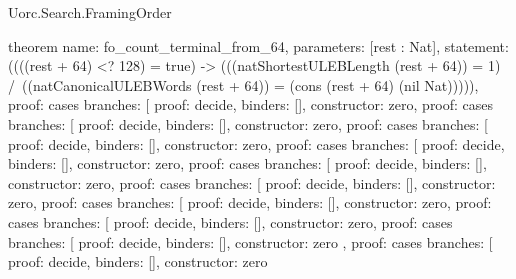 \begin{lexlean}{Uorc.Search.FramingOrder}
\begin{semanticmodule}
theorem{
  name: fo_count_terminal_from_64,
  parameters: [rest : Nat],
  statement: ((((rest + 64) <? 128) = true) -> (((natShortestULEBLength (rest + 64)) = 1) /\ ((natCanonicalULEBWords (rest + 64)) = (cons (rest + 64) (nil Nat))))),
  proof: cases{
    branches: [
      {proof: decide{}, binders: [], constructor: zero},
      {
        proof: cases{
          branches: [
            {proof: decide{}, binders: [], constructor: zero},
            {
              proof: cases{
                branches: [
                  {proof: decide{}, binders: [], constructor: zero},
                  {
                    proof: cases{
                      branches: [
                        {proof: decide{}, binders: [], constructor: zero},
                        {
                          proof: cases{
                            branches: [
                              {proof: decide{}, binders: [], constructor: zero},
                              {
                                proof: cases{
                                  branches: [
                                    {proof: decide{}, binders: [], constructor: zero},
                                    {
                                      proof: cases{
                                        branches: [
                                          {proof: decide{}, binders: [], constructor: zero},
                                          {
                                            proof: cases{
                                              branches: [
                                                {proof: decide{}, binders: [], constructor: zero},
                                                {
                                                  proof: cases{
                                                    branches: [
                                                      {
                                                        proof: decide{},
                                                        binders: [],
                                                        constructor: zero
                                                      },
                                                      {
                                                        proof: cases{
                                                          branches: [
                                                            {
                                                              proof: decide{},
                                                              binders: [],
                                                              constructor: zero
}}}}}}}}}}}}}}}}}}}}}
\end{semanticmodule}
\end{lexlean}
